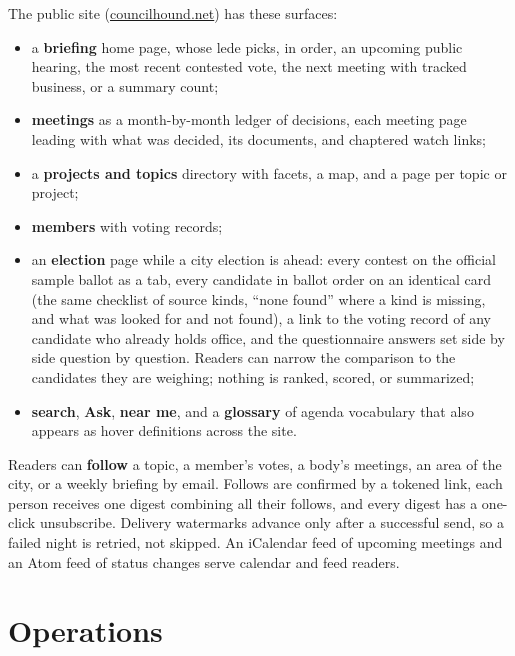 \documentclass[11pt]{article}
\begin{document}
The public site (\href{https://councilhound.net}{councilhound.net}) has these surfaces:
\begin{itemize}
  \item a \textbf{briefing} home page, whose lede picks, in order, an upcoming public
        hearing, the most recent contested vote, the next meeting with tracked business,
        or a summary count;
  \item \textbf{meetings} as a month-by-month ledger of decisions, each meeting page
        leading with what was decided, its documents, and chaptered watch links;
  \item a \textbf{projects and topics} directory with facets, a map, and a page per
        topic or project;
  \item \textbf{members} with voting records;
  \item an \textbf{election} page while a city election is ahead: every contest on the
        official sample ballot as a tab, every candidate in ballot order on an identical
        card (the same checklist of source kinds, ``none found'' where a kind is missing,
        and what was looked for and not found), a link to the voting record of any
        candidate who already holds office, and the questionnaire answers set side by
        side question by question. Readers can narrow the comparison to the candidates
        they are weighing; nothing is ranked, scored, or summarized;
  \item \textbf{search}, \textbf{Ask}, \textbf{near me}, and a \textbf{glossary} of
        agenda vocabulary that also appears as hover definitions across the site.
\end{itemize}

Readers can \textbf{follow} a topic, a member's votes, a body's meetings, an area of the
city, or a weekly briefing by email. Follows are confirmed by a tokened link, each person
receives one digest combining all their follows, and every digest has a one-click
unsubscribe. Delivery watermarks advance only after a successful send, so a failed night
is retried, not skipped. An iCalendar feed of upcoming meetings and an Atom feed of status
changes serve calendar and feed readers.

\section{Operations}
\label{sec:ops}
\end{document}
